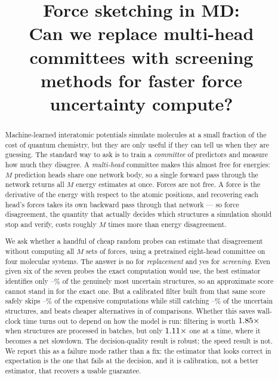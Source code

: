 \documentclass{article}
\title{Force sketching in MD:\\
Can we replace multi-head committees with screening\\
methods for faster force uncertainty compute?}
\author{}
\begin{document}
\maketitle

\begin{abstract}
Machine-learned interatomic potentials simulate molecules at a small fraction of the cost of quantum
chemistry, but they are only useful if they can tell us when they are guessing. The standard way to
ask is to train a \emph{committee} of predictors and measure how much they disagree. A
\emph{multi-head} committee makes this almost free for energies: $M$ prediction heads share one
network body, so a single forward pass through the network returns all $M$ energy estimates at once.
Forces are not free. A force is the derivative of the energy with respect to the atomic positions,
and recovering each head's forces takes its own backward pass through that network --- so force
disagreement, the quantity that actually decides which structures a simulation should stop and
verify, costs roughly $M$ times more than energy disagreement.

We ask whether a handful of cheap random probes can estimate that disagreement without computing all
$M$ sets of forces, using a pretrained eight-head committee on four molecular systems. The answer is
no for \emph{replacement} and yes for \emph{screening}. Even given six of the seven probes the exact
computation would use, the best estimator identifies only
\fsMaxRecallKSixLoPct--\fsMaxRecallKSixHiPct\% of the genuinely most uncertain structures, so an
approximate score cannot stand in for the exact one. But a calibrated filter built from that same
score safely skips \fsGateCVSkipLoPct--\fsGateCVSkipHiPct\% of the expensive computations while
still catching \fsGateCVRecallLoPct--\fsGateCVRecallHiPct\% of the uncertain structures, and beats
cheaper
alternatives in \fsGateCVDominates{} of \fsGateCVComparisons{} comparisons. Whether this saves
wall-clock time turns out to depend on how the model is run: filtering is worth
$1.85\times$ when structures are processed in batches, but only
$1.11\times$ one at a time, where it becomes a net slowdown. The decision-quality
result is robust; the speed result is not. We report this as a failure mode rather than a
fix: the estimator that looks correct in expectation is the one that fails at the decision, and it
is calibration, not a better estimator, that recovers a usable guarantee.
\end{abstract}
\end{document}
